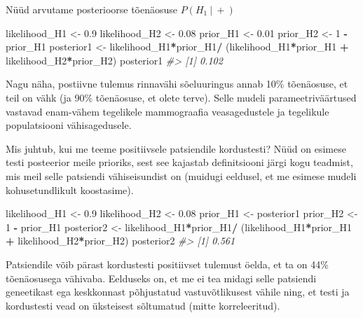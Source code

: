 \documentclass[]{book}
\newenvironment{Shaded}{\begin{snugshade}}{\end{snugshade}}
\newcommand{\DecValTok}[1]{\textcolor[rgb]{0.00,0.00,0.81}{#1}}
\newcommand{\FloatTok}[1]{\textcolor[rgb]{0.00,0.00,0.81}{#1}}
\newcommand{\StringTok}[1]{\textcolor[rgb]{0.31,0.60,0.02}{#1}}
\newcommand{\CommentTok}[1]{\textcolor[rgb]{0.56,0.35,0.01}{\textit{#1}}}
\newcommand{\OperatorTok}[1]{\textcolor[rgb]{0.81,0.36,0.00}{\textbf{#1}}}
\newcommand{\NormalTok}[1]{#1}
\begin{document}
Nüüd arvutame posterioorse tõenäosuse \(P(H_1~\vert~+)\)

\begin{Shaded}
\begin{Highlighting}[]
\NormalTok{likelihood_H1 <-}\StringTok{ }\FloatTok{0.9}
\NormalTok{likelihood_H2 <-}\StringTok{ }\FloatTok{0.08}
\NormalTok{prior_H1 <-}\StringTok{ }\FloatTok{0.01}
\NormalTok{prior_H2 <-}\StringTok{ }\DecValTok{1} \OperatorTok{-}\StringTok{ }\NormalTok{prior_H1}
\NormalTok{posterior1 <-}\StringTok{ }\NormalTok{likelihood_H1}\OperatorTok{*}\NormalTok{prior_H1}\OperatorTok{/}
\StringTok{  }\NormalTok{(likelihood_H1}\OperatorTok{*}\NormalTok{prior_H1 }\OperatorTok{+}\StringTok{ }
\StringTok{     }\NormalTok{likelihood_H2}\OperatorTok{*}\NormalTok{prior_H2)}
\NormalTok{posterior1}
\CommentTok{#> [1] 0.102}
\end{Highlighting}
\end{Shaded}

Nagu näha, postiivne tulemus rinnavähi sõeluuringus annab 10\%
tõenäosuse, et teil on vähk (ja 90\% tõenäosuse, et olete terve). Selle
mudeli parameetriväärtused vastavad enam-vähem tegelikele mammograafia
veasagedustele ja tegelikule populatsiooni vähisagedusele.

Mis juhtub, kui me teeme positiivsele patsiendile kordustesti? Nüüd on
esimese testi posteerior meile prioriks, sest see kajastab definitsiooni
järgi kogu teadmist, mis meil selle patsiendi vähiseisundist on (muidugi
eeldusel, et me esimese mudeli kohusetundlikult koostasime).

\begin{Shaded}
\begin{Highlighting}[]
\NormalTok{likelihood_H1 <-}\StringTok{ }\FloatTok{0.9}
\NormalTok{likelihood_H2 <-}\StringTok{ }\FloatTok{0.08}
\NormalTok{prior_H1 <-}\StringTok{ }\NormalTok{posterior1}
\NormalTok{prior_H2 <-}\StringTok{ }\DecValTok{1} \OperatorTok{-}\StringTok{ }\NormalTok{prior_H1}
\NormalTok{posterior2 <-}\StringTok{ }\NormalTok{likelihood_H1}\OperatorTok{*}\NormalTok{prior_H1}\OperatorTok{/}
\StringTok{  }\NormalTok{(likelihood_H1}\OperatorTok{*}\NormalTok{prior_H1 }\OperatorTok{+}\StringTok{ }
\StringTok{     }\NormalTok{likelihood_H2}\OperatorTok{*}\NormalTok{prior_H2)}
\NormalTok{posterior2}
\CommentTok{#> [1] 0.561}
\end{Highlighting}
\end{Shaded}

Patsiendile võib pärast kordustesti positiivset tulemust öelda, et ta on
44\% tõenäosusega vähivaba. Eelduseks on, et me ei tea midagi selle
patsiendi geneetikast ega keskkonnast põhjustatud vastuvõtlikusest
vähile ning, et testi ja kordustesti vead on üksteisest sõltumatud
(mitte korreleeritud).
\end{document}
